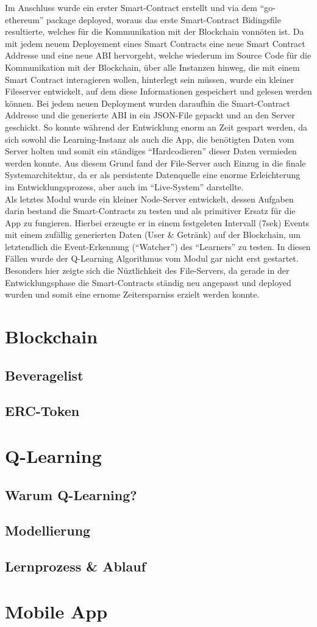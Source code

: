 Im Anschluss wurde ein erster Smart-Contract erstellt und via dem “go-ethereum” package deployed, woraus das erste Smart-Contract Bidingsfile resultierte, welches für die Kommunikation mit der Blockchain vonnöten ist. Da mit jedem neuem Deployement eines Smart Contracts eine neue Smart Contract Addresse und eine neue ABI hervorgeht, welche wiederum im Source Code für die Kommunikation mit der Blockchain, über alle Instanzen hinweg, die mit einem Smart Contract interagieren wollen, hinterlegt sein müssen, wurde ein kleiner Fileserver entwickelt, auf dem diese Informationen gespeichert und gelesen werden können. Bei jedem neuen Deployment wurden daraufhin die Smart-Contract Addresse und die generierte ABI in ein JSON-File gepackt und an den Server geschickt. So konnte während der Entwicklung enorm an Zeit gespart werden, da sich sowohl die Learning-Instanz als auch die App, die benötigten Daten vom Server holten und somit ein ständiges “Hardcodieren” dieser Daten vermieden werden konnte. Aus diesem Grund fand der File-Server auch Einzug in die finale Systemarchitektur, da er als persistente Datenquelle eine enorme Erleichterung im Entwicklungsprozess, aber auch im “Live-System” darstellte. \\
Als letztes Modul wurde ein kleiner Node-Server entwickelt, dessen Aufgaben darin bestand die Smart-Contracts zu testen und als primitiver Ersatz für die App zu fungieren. Hierbei erzeugte er in einem festgeleten Intervall (7sek) Events mit einem zufällig generierten Daten (User \& Getränk) auf der Blockchain, um letztendlich die Event-Erkennung (“Watcher”) des “Learners” zu testen. In diesen Fällen wurde der Q-Learning Algorithmus vom Modul gar nicht erst gestartet. \\
Besonders hier zeigte sich die Nüztlichkeit des File-Servers, da gerade in der Entwicklungsphase die Smart-Contracts ständig neu angepasst und deployed wurden und somit eine ernome Zeitersparniss erzielt werden konnte.

\section{Blockchain}
\subsection{Beveragelist}
\subsection{ERC-Token}

\section{Q-Learning}
\subsection{Warum Q-Learning?}
\subsection{Modellierung}
\subsection{Lernprozess \& Ablauf}

\section{Mobile App}


